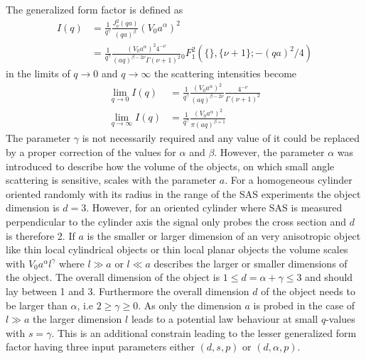 The generalized form factor is defined as
\begin{align}\label{eq:generalizedFF}
  I(q) &=  \frac{1}{q^\gamma}\frac{J_\nu^2(qa)}{(qa)^\beta} \left(V_0a^\alpha\right)^2 \\
       &=  \frac{1}{q^\gamma}\frac{\left(V_0a^{\alpha}\right)^2 4^{-\nu }}{(a q)^{\beta-2 \nu}\Gamma (\nu +1)^2} {}_0^{\phantom{2}}F^2_1\left(\{\},\{\nu+1\};-(qa)^2/4\right)
\end{align}
in the limits of $q\rightarrow 0$ and $q\rightarrow \infty$ the scattering intensities become
\begin{align}\label{eq:generalizedFFlimits}
\lim_{q\rightarrow 0}      I(q) & = \frac{1}{q^\gamma}\frac{\left(V_0a^{\alpha}\right)^2}{(a q)^{\beta -2\nu}}\frac{4^{-\nu }}{\Gamma (\nu +1)^2} \\
\lim_{q\rightarrow \infty} I(q) & = \frac{1}{q^\gamma}\frac{\left(V_0a^{\alpha}\right)^2}{\pi(aq)^{\beta+1}}
\end{align}
The parameter $\gamma$ is not necessarily required and any value of it could be replaced by a proper correction of the values for $\alpha$ and $\beta$. However, the parameter $\alpha$ was introduced to describe how the volume of the objects, on which small angle scattering is sensitive, scales with the parameter $a$. For a homogeneous cylinder oriented randomly with its radius in the range of the SAS experiments the object dimension is $d=3$. However, for an oriented cylinder where SAS is measured perpendicular to the cylinder axis the signal only probes the cross section and $d$ is therefore 2. If $a$ is the smaller or larger dimension of an very anisotropic object like thin local cylindrical objects or thin local planar objects the volume scales with $V_0a^\alpha l^\gamma$ where $l\gg a$ or $l\ll a$ describes the larger or smaller dimensions of the object. The overall dimension of the object is $1\leq d=\alpha+\gamma\leq3$ and should lay between 1 and 3. Furthermore the overall dimension $d$ of the object needs to be larger than $\alpha$, i.e $2\geq\gamma\geq 0$. As only the dimension $a$ is probed in the case of $l\gg a$ the larger dimension $l$ leads to a potential law behaviour at small $q$-values with $s=\gamma$. This is an additional constrain leading to the lesser generalized form factor having three input parameters either $(d,s,p)$ or $(d,\alpha,p)$.
